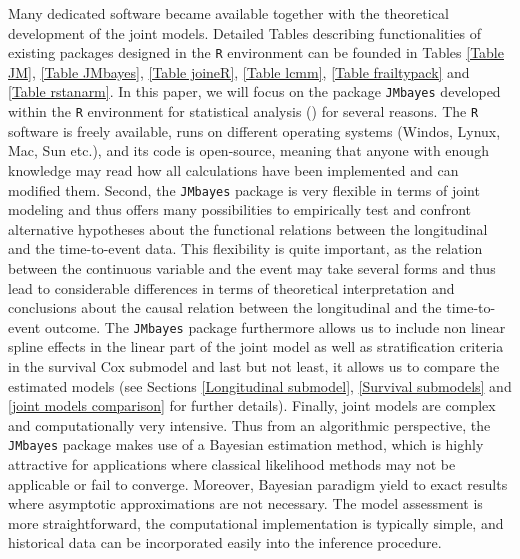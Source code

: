 \documentclass[12pt]{article}
\begin{document}
Many dedicated software became available together with the theoretical development of the joint models. Detailed Tables describing functionalities of existing packages designed in the \texttt{R} environment can be founded in Tables \ref{Table JM}, \ref{Table JMbayes}, \ref{Table joineR}, \ref{Table lcmm}, \ref{Table frailtypack} and \ref{Table rstanarm}. In this paper, we will focus on the package \texttt{JMbayes} developed within the \texttt{R} environment for statistical analysis (\cite{R}) for several reasons. The \texttt{R} software is freely available, runs on different operating systems (Windos, Lynux, Mac, Sun etc.), and its code is open-source, meaning that anyone with enough knowledge may read how all calculations have been implemented and can modified them. Second, the \texttt{JMbayes} package is very flexible in terms of joint modeling and thus offers many possibilities to empirically test and confront alternative hypotheses about the functional relations between the longitudinal and the time-to-event data. This flexibility is quite important, as the relation between the continuous variable and the event may take several forms and thus lead to considerable differences in terms of theoretical interpretation and conclusions about the causal relation between the longitudinal and the time-to-event outcome. The \texttt{JMbayes} package furthermore allows us to include non linear spline effects in the linear part of the joint model as well as stratification criteria in the survival Cox submodel and last but not least, it allows us to compare the estimated models (see Sections \ref{Longitudinal submodel}, \ref{Survival submodels} and \ref{joint models comparison} for further details). Finally, joint models are complex and computationally very intensive. Thus from an algorithmic perspective, the \texttt{JMbayes} package makes use of a Bayesian estimation method, which is highly attractive for applications where classical likelihood methods may not be applicable or fail to converge. Moreover, Bayesian paradigm yield to exact results where asymptotic approximations are not necessary. The model assessment is more straightforward, the computational implementation is typically simple, and historical data can be incorporated easily into the inference procedure. 
\end{document}
